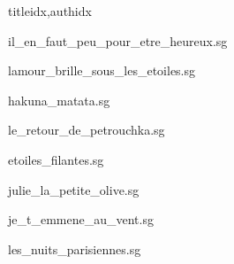 \documentclass[12pt]{article}
\begin{document}
\begin{songs}{titleidx,authidx}

{il_en_faut_peu_pour_etre_heureux.sg}


{lamour_brille_sous_les_etoiles.sg}


{hakuna_matata.sg}


{le_retour_de_petrouchka.sg}


{etoiles_filantes.sg}


{julie_la_petite_olive.sg}


{je_t_emmene_au_vent.sg}


{les_nuits_parisiennes.sg}



\end{songs}
\end{document}
